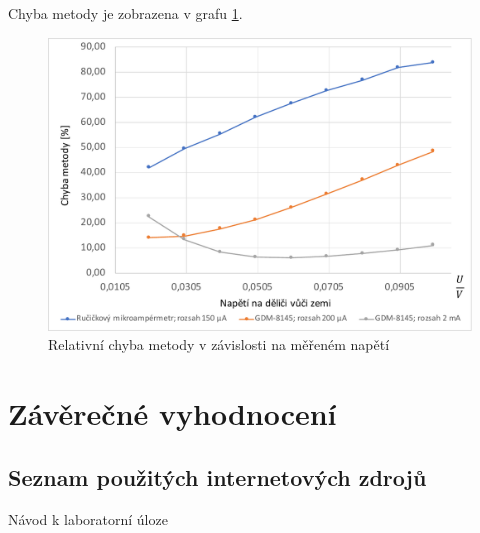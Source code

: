 \documentclass[a4paper,12pt]{article}   %
\begin{document}
Chyba metody je zobrazena v grafu \ref{graf:chyba}.
\begin{figure}
    \centering
    \includegraphics[width=.8\textwidth]{graf_chyba.pdf}
    \caption{Relativní chyba metody v závislosti na měřeném napětí}
    \label{graf:chyba}
\end{figure}

\section{Závěrečné vyhodnocení}



\clearpage
\renewcommand{\refname}{Seznam použité literatury a~zdrojů informací} 

\begin{thebibliography}{99}

\subsection*{Seznam použitých internetových zdrojů}
     Návod k laboratorní úloze
    
\end{thebibliography}
\end{document}
